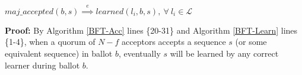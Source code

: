 \begin{lemma}
$maj\_accepted(b,s) \overset{e}{\implies} learned(l_i,b,s),\ \forall\ l_i \in \mathcal{L}$ \label{L-L3} \par
\end{lemma}
\textbf{Proof:} By Algorithm \ref{BFT-Acc} lines \{20-31\} and Algorithm \ref{BFT-Learn} lines \{1-4\}, when a quorum of $N-f$ acceptors accepts a sequence $s$ (or some equivalent sequence) in ballot $b$, eventually $s$ will be learned by any correct learner during ballot $b$.
